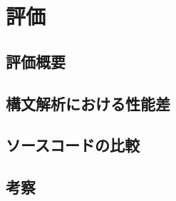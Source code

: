 \chapter{評価}
\label{conclusion}

\section{評価概要}

\section{構文解析における性能差}

\section{ソースコードの比較}

\section{考察}


